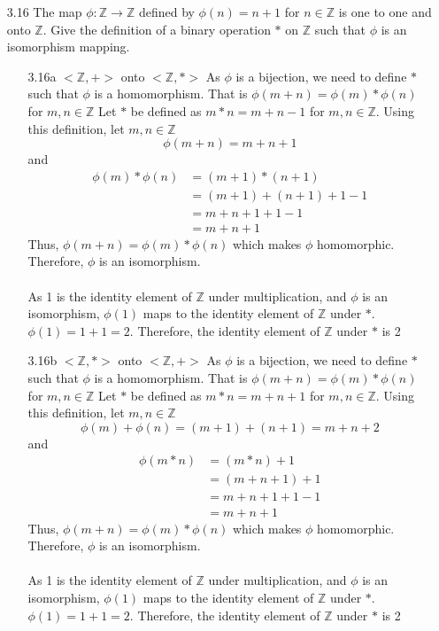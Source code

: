 \documentclass[12pt]{article}
\newcommand{\Z}{\mathds{Z}}
\begin{document}
\begin{enumerate}
\begin{enumerate}
			\item[3.16] The map $\phi: \Z \rightarrow \Z$ defined by $\phi (n) = n+1$ for $n \in \Z$ is one to one and onto $\Z$. Give the definition of a binary operation $*$ on $\Z$ such that $\phi$ is an isomorphism mapping.
			\begin{enumerate}
				\item[3.16a]
				$<\Z,+>$ onto $<\Z,\ast>$
				As $ \phi $ is a bijection, we need to define $ * $ such that $ \phi $ is a homomorphism. That is $ \phi(m+n)=\phi(m)*\phi(n) $ for $ m,n \in\Z $
				Let $ * $ be defined as $ m*n = m+n-1$ for $ m,n\in\Z $. Using this definition, let $ m,n\in\Z $
					\[\phi(m + n)=m+n+1\] and
					\begin{align*}
						\phi(m)*\phi(n) &= (m+1)*(n+1)\\
										&= (m+1) + (n+1) + 1 - 1\\
										&= m + n + 1 + 1 -1\\
										&= m+n+1
					\end{align*}
					Thus, $ \phi(m+n)=\phi(m)*\phi(n) $ which makes $ \phi $ homomorphic.\\
					Therefore, $ \phi $ is an isomorphism.\\
					\\
					As 1 is the identity element of $\Z$  under multiplication, and $ \phi $ is an isomorphism, $ \phi(1) $ maps to the identity element of $ \Z $ under $ * $. $ \phi(1) = 1+1=2 $. Therefore, the identity element of $ \Z $ under $ * $ is 2
				\item[3.16b]
				$<\Z,\ast>$ onto $<\Z,+>$
					As $ \phi $ is a bijection, we need to define $ * $ such that $ \phi $ is a homomorphism. That is $ \phi(m+n)=\phi(m)*\phi(n) $ for $ m,n \in\Z $
					Let $ * $ be defined as $ m*n = m+n+1$ for $ m,n\in\Z $. Using this definition, let $ m,n\in\Z $
					\[\phi(m)+\phi(n)=(m+1)+(n+1)=m+n+2\] and
					\begin{align*}
						\phi(m * n) &= (m*n)+1\\
						&= (m+n+1)+1\\
						&= m + n + 1 + 1 -1\\
						&= m+n+1
					\end{align*}
					Thus, $ \phi(m+n)=\phi(m)*\phi(n) $ which makes $ \phi $ homomorphic.\\
					Therefore, $ \phi $ is an isomorphism.\\
					\\
					As 1 is the identity element of $\Z$  under multiplication, and $ \phi $ is an isomorphism, $ \phi(1) $ maps to the identity element of $ \Z $ under $ * $. $ \phi(1) = 1+1=2 $. Therefore, the identity element of $ \Z $ under $ * $ is 2
			\end{enumerate}
			

\end{enumerate}
\end{enumerate}
\end{document}

